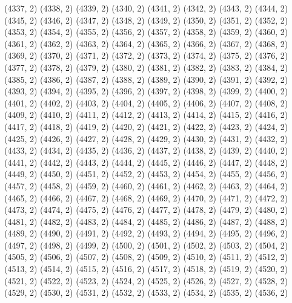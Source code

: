 {   (4337, 2)
   (4338, 2)
   (4339, 2)
   (4340, 2)
   (4341, 2)
   (4342, 2)
   (4343, 2)
   (4344, 2)
   (4345, 2)
   (4346, 2)
   (4347, 2)
   (4348, 2)
   (4349, 2)
   (4350, 2)
   (4351, 2)
   (4352, 2)
   (4353, 2)
   (4354, 2)
   (4355, 2)
   (4356, 2)
   (4357, 2)
   (4358, 2)
   (4359, 2)
   (4360, 2)
   (4361, 2)
   (4362, 2)
   (4363, 2)
   (4364, 2)
   (4365, 2)
   (4366, 2)
   (4367, 2)
   (4368, 2)
   (4369, 2)
   (4370, 2)
   (4371, 2)
   (4372, 2)
   (4373, 2)
   (4374, 2)
   (4375, 2)
   (4376, 2)
   (4377, 2)
   (4378, 2)
   (4379, 2)
   (4380, 2)
   (4381, 2)
   (4382, 2)
   (4383, 2)
   (4384, 2)
   (4385, 2)
   (4386, 2)
   (4387, 2)
   (4388, 2)
   (4389, 2)
   (4390, 2)
   (4391, 2)
   (4392, 2)
   (4393, 2)
   (4394, 2)
   (4395, 2)
   (4396, 2)
   (4397, 2)
   (4398, 2)
   (4399, 2)
   (4400, 2)
   (4401, 2)
   (4402, 2)
   (4403, 2)
   (4404, 2)
   (4405, 2)
   (4406, 2)
   (4407, 2)
   (4408, 2)
   (4409, 2)
   (4410, 2)
   (4411, 2)
   (4412, 2)
   (4413, 2)
   (4414, 2)
   (4415, 2)
   (4416, 2)
   (4417, 2)
   (4418, 2)
   (4419, 2)
   (4420, 2)
   (4421, 2)
   (4422, 2)
   (4423, 2)
   (4424, 2)
   (4425, 2)
   (4426, 2)
   (4427, 2)
   (4428, 2)
   (4429, 2)
   (4430, 2)
   (4431, 2)
   (4432, 2)
   (4433, 2)
   (4434, 2)
   (4435, 2)
   (4436, 2)
   (4437, 2)
   (4438, 2)
   (4439, 2)
   (4440, 2)
   (4441, 2)
   (4442, 2)
   (4443, 2)
   (4444, 2)
   (4445, 2)
   (4446, 2)
   (4447, 2)
   (4448, 2)
   (4449, 2)
   (4450, 2)
   (4451, 2)
   (4452, 2)
   (4453, 2)
   (4454, 2)
   (4455, 2)
   (4456, 2)
   (4457, 2)
   (4458, 2)
   (4459, 2)
   (4460, 2)
   (4461, 2)
   (4462, 2)
   (4463, 2)
   (4464, 2)
   (4465, 2)
   (4466, 2)
   (4467, 2)
   (4468, 2)
   (4469, 2)
   (4470, 2)
   (4471, 2)
   (4472, 2)
   (4473, 2)
   (4474, 2)
   (4475, 2)
   (4476, 2)
   (4477, 2)
   (4478, 2)
   (4479, 2)
   (4480, 2)
   (4481, 2)
   (4482, 2)
   (4483, 2)
   (4484, 2)
   (4485, 2)
   (4486, 2)
   (4487, 2)
   (4488, 2)
   (4489, 2)
   (4490, 2)
   (4491, 2)
   (4492, 2)
   (4493, 2)
   (4494, 2)
   (4495, 2)
   (4496, 2)
   (4497, 2)
   (4498, 2)
   (4499, 2)
   (4500, 2)
   (4501, 2)
   (4502, 2)
   (4503, 2)
   (4504, 2)
   (4505, 2)
   (4506, 2)
   (4507, 2)
   (4508, 2)
   (4509, 2)
   (4510, 2)
   (4511, 2)
   (4512, 2)
   (4513, 2)
   (4514, 2)
   (4515, 2)
   (4516, 2)
   (4517, 2)
   (4518, 2)
   (4519, 2)
   (4520, 2)
   (4521, 2)
   (4522, 2)
   (4523, 2)
   (4524, 2)
   (4525, 2)
   (4526, 2)
   (4527, 2)
   (4528, 2)
   (4529, 2)
   (4530, 2)
   (4531, 2)
   (4532, 2)
   (4533, 2)
   (4534, 2)
   (4535, 2)
   (4536, 2)
}
